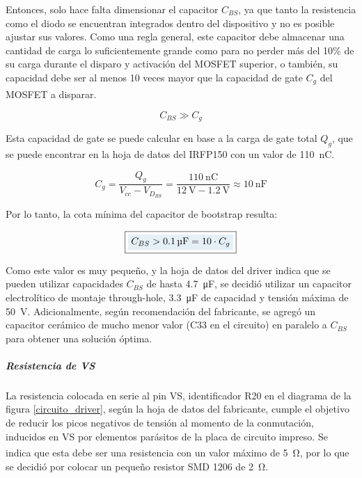 Entonces, solo hace falta dimensionar el capacitor $C_{BS}$, ya que tanto la resistencia como el diodo se encuentran integrados dentro del dispositivo y no es posible ajustar sus valores. Como una regla general, este capacitor debe almacenar una cantidad de carga lo suficientemente grande como para no perder más del 10\% de su carga durante el disparo y activación del MOSFET superior, o también, su capacidad debe ser al menos 10 veces mayor que la capacidad de gate $C_g$ del MOSFET a disparar.\textsuperscript{\cite{Bootstrap}}

\begin{equation*}
    C_{BS} \gg C_g
\end{equation*}

Esta capacidad de gate se puede calcular en base a la carga de gate total $Q_g$, que se puede encontrar en la hoja de datos del IRFP150 con un valor de \SI[]{110}{\nano\coulomb}.

\begin{equation}\label{capacidad_gate}
    C_g = \frac{Q_g}{V_{cc}-V_{D_{BS}}} = \frac{\SI[]{110}{\nano\coulomb}}{\SI[]{12}{\volt}-\SI[]{1.2}{\volt}} \approx \SI[]{10}{\nano\farad}
\end{equation}

Por lo tanto, la cota mínima del capacitor de bootstrap resulta:

\begin{equation}\label{capacidad_bs_min}
    \boxed{\highlight{
    C_{BS} > \SI[]{0.1}{\micro\farad} = 10\cdot C_g}}
\end{equation}

Como este valor es muy pequeño, y la hoja de datos del driver indica que se pueden utilizar capacidades $C_{BS}$ de hasta \SI[]{4.7}{\micro\farad}, se decidió utilizar un capacitor electrolítico de montaje through-hole, \SI[]{3.3}{\micro\farad} de capacidad y tensión máxima de \SI[]{50}{\volt}. Adicionalmente, según recomendación del fabricante, se agregó un capacitor cerámico de mucho menor valor (C33 en el circuito) en paralelo a $C_{BS}$ para obtener una solución óptima.\\

\subparagraph{Resistencia de VS}

La resistencia colocada en serie al pin VS, identificador R20 en el diagrama de la figura \ref{circuito_driver}, según la hoja de datos del fabricante, cumple el objetivo de reducir los picos negativos de tensión al momento de la conmutación, inducidos en VS por elementos parásitos de la placa de circuito impreso. Se indica que esta debe ser una resistencia con un valor máximo de \SI[]{5}{\ohm}\textsuperscript{\cite{DatasheetDriver}}, por lo que se decidió por colocar un pequeño resistor SMD 1206 de \SI[]{2}{\ohm}.\\